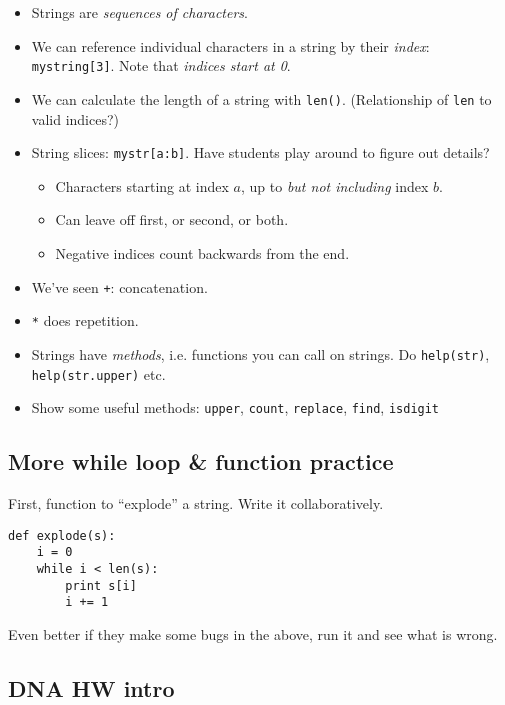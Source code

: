\documentclass{article}
\begin{document}
\begin{itemize}
\item Strings are \emph{sequences of characters}.

\item We can reference individual characters in a string by their
  \emph{index}: \verb|mystring[3]|.  Note that \emph{indices start at 0}.

\item We can calculate the length of a string with \verb|len()|.
  (Relationship of \verb|len| to valid indices?)

\item String slices: \verb|mystr[a:b]|.  Have students play around to
  figure out details?
  \begin{itemize}
  \item Characters starting at index $a$, up to \emph{but not
      including} index $b$.
  \item Can leave off first, or second, or both.
  \item Negative indices count backwards from the end.
  \end{itemize}

\item We've seen \verb|+|: concatenation.
\item \verb|*| does repetition.

\item Strings have \emph{methods}, i.e. functions you can call on
  strings.  Do \verb|help(str)|, \verb|help(str.upper)| etc.
\item Show some useful methods: \verb|upper|, \verb|count|,
  \verb|replace|, \verb|find|, \verb|isdigit|
\end{itemize}

\subsection*{More while loop \& function practice}

First, function to ``explode'' a string.  Write it collaboratively.

\begin{verbatim}
def explode(s):
    i = 0
    while i < len(s):
        print s[i]
        i += 1
\end{verbatim}

Even better if they make some bugs in the above, run it and see what
is wrong.

\subsection*{DNA HW intro}
\end{document}
